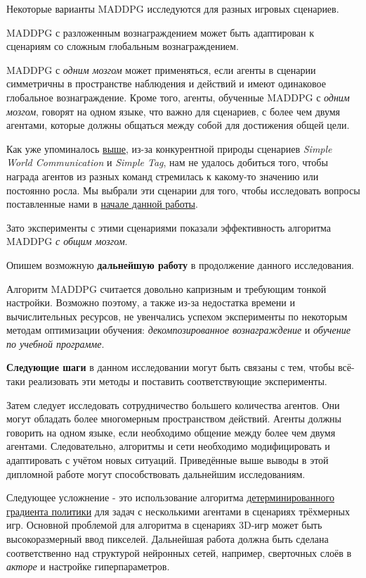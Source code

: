 Некоторые варианты MADDPG исследуются для разных игровых сценариев.

MADDPG с разложенным вознаграждением может быть адаптирован к сценариям со сложным глобальным вознаграждением.

MADDPG с \textit{одним мозгом} может применяться, если агенты в сценарии симметричны в пространстве наблюдения и действий и имеют одинаковое глобальное вознаграждение. Кроме того, агенты, обученные MADDPG с \textit{одним мозгом}, говорят на одном языке, что важно для сценариев, с более чем двумя агентами, которые должны общаться между собой для достижения общей цели.

Как уже упоминалось \hyperref[exp-results-svc]{выше}, из-за конкурентной природы сценариев \textit{Simple World Communication} и \textit{Simple Tag}, нам не удалось добиться того, чтобы награда агентов из разных команд стремилась к какому-то значению или постоянно росла. Мы выбрали эти сценарии для того, чтобы исследовать вопросы поставленные нами в \hyperref[intro-questions]{начале данной работы}.

Зато эксперименты с этими сценариями показали эффективность алгоритма MADDPG \textit{с общим мозгом}.

Опишем возможную \textbf{дальнейшую работу} в продолжение данного исследования.

Алгоритм MADDPG считается довольно капризным и требующим тонкой настройки. Возможно поэтому, а также из-за недостатка времени и вычислительных ресурсов, не увенчались успехом эксперименты по некоторым методам оптимизации обучения: \textit{декомпозированное вознаграждение} и \textit{обучение по учебной программе}.

\textbf{Следующие шаги} в данном исследовании могут быть связаны с тем, чтобы всё-таки реализовать эти методы и поставить соответствующие эксперименты.

Затем следует исследовать сотрудничество большего количества агентов. Они могут обладать более многомерным пространством действий. Агенты должны говорить на одном языке, если необходимо общение между более чем двумя агентами. Следовательно, алгоритмы и сети необходимо модифицировать и адаптировать с учётом новых ситуаций. Приведённые выше выводы в этой дипломной работе могут способствовать дальнейшим исследованиям.

Следующее усложнение - это использование алгоритма \hyperref[acr:dpg]{детерминированного градиента политики} для задач с несколькими агентами в сценариях трёхмерных игр. Основной проблемой для алгоритма в сценариях 3D-игр может быть высокоразмерный ввод пикселей. Дальнейшая работа должна быть сделана соответственно над структурой нейронных сетей, например, сверточных слоёв в \textit{акторе} и настройке гиперпараметров.

